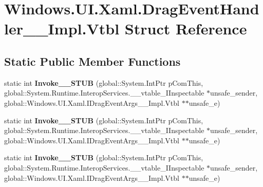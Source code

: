 \hypertarget{struct_windows_1_1_u_i_1_1_xaml_1_1_drag_event_handler_____impl_1_1_vtbl}{}\section{Windows.\+U\+I.\+Xaml.\+Drag\+Event\+Handler\+\_\+\+\_\+\+Impl.\+Vtbl Struct Reference}
\label{struct_windows_1_1_u_i_1_1_xaml_1_1_drag_event_handler_____impl_1_1_vtbl}
\subsection*{Static Public Member Functions}
\begin{DoxyCompactItemize}
\item 
\mbox{\label{struct_windows_1_1_u_i_1_1_xaml_1_1_drag_event_handler_____impl_1_1_vtbl_a3128450f454a34995f7d608101ca0067}} 
static int {\bfseries Invoke\+\_\+\+\_\+\+S\+T\+UB} (global\+::\+System.\+Int\+Ptr p\+Com\+This, global\+::\+System.\+Runtime.\+Interop\+Services.\+\_\+\+\_\+vtable\+\_\+\+I\+Inspectable $\ast$unsafe\+\_\+sender, global\+::\+Windows.\+U\+I.\+Xaml.\+I\+Drag\+Event\+Args\+\_\+\+\_\+\+Impl.\+Vtbl $\ast$$\ast$unsafe\+\_\+e)
\item 
\mbox{\label{struct_windows_1_1_u_i_1_1_xaml_1_1_drag_event_handler_____impl_1_1_vtbl_a3128450f454a34995f7d608101ca0067}} 
static int {\bfseries Invoke\+\_\+\+\_\+\+S\+T\+UB} (global\+::\+System.\+Int\+Ptr p\+Com\+This, global\+::\+System.\+Runtime.\+Interop\+Services.\+\_\+\+\_\+vtable\+\_\+\+I\+Inspectable $\ast$unsafe\+\_\+sender, global\+::\+Windows.\+U\+I.\+Xaml.\+I\+Drag\+Event\+Args\+\_\+\+\_\+\+Impl.\+Vtbl $\ast$$\ast$unsafe\+\_\+e)
\item 
\mbox{\label{struct_windows_1_1_u_i_1_1_xaml_1_1_drag_event_handler_____impl_1_1_vtbl_a3128450f454a34995f7d608101ca0067}} 
static int {\bfseries Invoke\+\_\+\+\_\+\+S\+T\+UB} (global\+::\+System.\+Int\+Ptr p\+Com\+This, global\+::\+System.\+Runtime.\+Interop\+Services.\+\_\+\+\_\+vtable\+\_\+\+I\+Inspectable $\ast$unsafe\+\_\+sender, global\+::\+Windows.\+U\+I.\+Xaml.\+I\+Drag\+Event\+Args\+\_\+\+\_\+\+Impl.\+Vtbl $\ast$$\ast$unsafe\+\_\+e)
$$
\end{DoxyCompactItemize}
